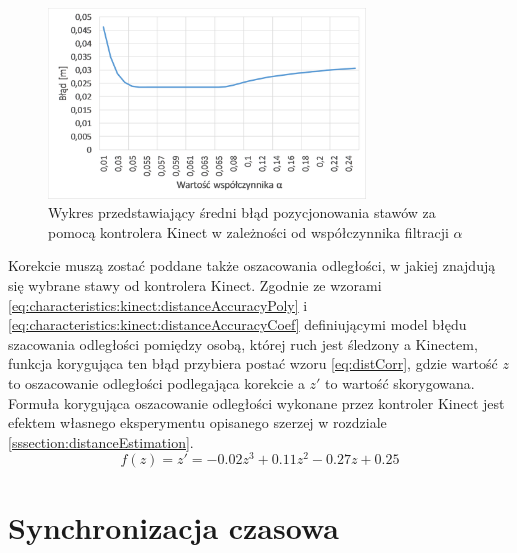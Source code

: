 \begin{figure}[!htb]
	\centering 
	\includegraphics[width=0.75\textwidth]{images/kinectPosErrorAlpha.png}
	\caption{Wykres przedstawiający średni błąd pozycjonowania stawów za pomocą kontrolera Kinect w zależności od współczynnika filtracji $\alpha$}
	\label{fig:hybrid:kinect:lpf}
\end{figure}

Korekcie muszą zostać poddane także oszacowania odległości, w jakiej znajdują się wybrane stawy od kontrolera Kinect. Zgodnie ze wzorami \eqref{eq:characteristics:kinect:distanceAccuracyPoly} i \eqref{eq:characteristics:kinect:distanceAccuracyCoef} definiującymi model błędu szacowania odległości pomiędzy osobą, której ruch jest śledzony a Kinectem, funkcja korygująca ten błąd przybiera postać wzoru \eqref{eq:distCorr}, gdzie wartość $z$ to oszacowanie odległości podlegająca korekcie 
a $z'$ to wartość skorygowana. Formuła korygująca oszacowanie odległości wykonane przez kontroler Kinect jest efektem własnego eksperymentu opisanego szerzej w rozdziale \ref{sssection:distanceEstimation}.
\begin{equation}
	f(z) = z' = -0.02z^3 + 0.11z^2 - 0.27z + 0.25
	\label{eq:distCorr}
\end{equation}
 

\section{Synchronizacja czasowa}

